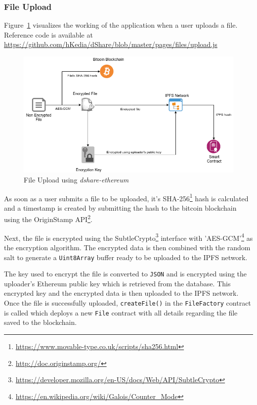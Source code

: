 			\subsubsection{File Upload}
				Figure~\ref{fig:ethereum-upload} visualizes the working of the application when a user uploads a file. Reference code is available at \url{https://github.com/hKedia/dShare/blob/master/pages/files/upload.js}
				
				\begin{figure}[h]
					\includegraphics[width=\linewidth]{figures/ethereum-upload}
					\caption{\label{fig:ethereum-upload} File Upload using \textit{dshare-ethereum}}
				\end{figure}
				
				As soon as a user submits a file to be uploaded, it's SHA-256\footnote{\url{https://www.movable-type.co.uk/scripts/sha256.html}} hash is calculated and a timestamp is created by submitting the hash to the bitcoin blockchain using the OriginStamp API\footnote{\url{http://doc.originstamp.org/}}.
				
				Next, the file is encrypted using the SubtleCrypto\footnote{\url{https://developer.mozilla.org/en-US/docs/Web/API/SubtleCrypto}} interface with 'AES-GCM'\footnote{\url{https://en.wikipedia.org/wiki/Galois/Counter_Mode}} as the encryption algorithm. The encrypted data is then combined with the random salt to generate a \texttt{Uint8Array} buffer ready to be uploaded to the IPFS network.
				
				The key used to encrypt the file is converted to \texttt{JSON} and is encrypted using the uploader's Ethereum public key which is retrieved from the database. This encrypted key and the encrypted data is then uploaded to the IPFS network. Once the file is successfully uploaded, \texttt{createFile()} in the \texttt{FileFactory} contract is called which deploys a new \texttt{File} contract with all details regarding the file saved to the blockchain.
			
